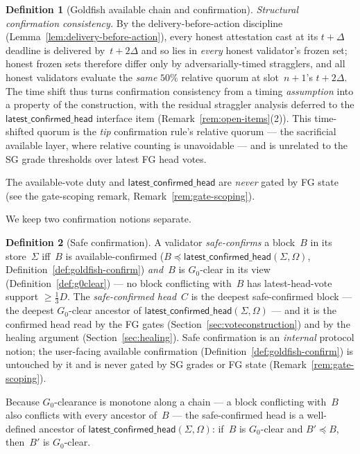 \ifx\litemode\undefined\documentclass{article}\fi
\newcommand{\Dvote}{\ensuremath{D}}         %
\newcommand{\Gzero}{\ensuremath{G_{0}}}
\newcommand{\latestConfirmed}{\textsf{latest\_confirmed\_head}\xspace}
\theoremstyle{plain}
\theoremstyle{definition}
\newtheorem{definition}{Definition}
\theoremstyle{remark}
\begin{document}
\begin{definition}[Goldfish available chain and confirmation]
\emph{Structural confirmation consistency.}  By the delivery-before-action
discipline (Lemma~\ref{lem:delivery-before-action}), every honest attestation
cast at its $t+\Delta$ deadline is delivered by~$t+2\Delta$ and so lies in
\emph{every} honest validator's frozen set; honest frozen sets therefore differ
only by adversarially-timed stragglers, and all honest validators evaluate the
\emph{same} $50\%$ relative quorum at slot~$n+1$'s $t+2\Delta$.  The time shift
thus turns confirmation consistency from a timing \emph{assumption} into a
property of the construction, with the residual straggler analysis deferred to
the $\latestConfirmed$ interface item (Remark~\ref{rem:open-items}(2)).
This time-shifted quorum is the \emph{tip} confirmation rule's relative quorum
--- the sacrificial available layer, where relative counting is unavoidable ---
and is unrelated to the SG grade thresholds over latest FG head votes.

The available-vote duty and $\latestConfirmed$ are \emph{never} gated by FG
state (see the gate-scoping remark, Remark~\ref{rem:gate-scoping}).
\end{definition}

We keep two confirmation notions separate.

\begin{definition}[Safe confirmation]\label{def:safe-confirm}
A validator \emph{safe-confirms} a block~$B$ in its store~$\Sigma$ iff~$B$ is
available-confirmed ($B \preceq \latestConfirmed(\Sigma, \Omega)$,
Definition~\ref{def:goldfish-confirm}) \emph{and}~$B$ is $\Gzero$-clear in its
view (Definition~\ref{def:g0clear}) --- no block conflicting with~$B$ has
latest-head-vote support $\geq \tfrac13\Dvote$.  The \emph{safe-confirmed head}~$C$ is the
deepest safe-confirmed block --- the deepest $\Gzero$-clear ancestor of
$\latestConfirmed(\Sigma, \Omega)$ --- and it is the confirmed head read by the
FG gates (Section~\ref{sec:voteconstruction}) and by the healing argument
(Section~\ref{sec:healing}).  Safe confirmation is an \emph{internal} protocol
notion; the user-facing available confirmation
(Definition~\ref{def:goldfish-confirm}) is untouched by it and is never gated
by SG grades or FG state (Remark~\ref{rem:gate-scoping}).
\end{definition}

Because $\Gzero$-clearance is monotone along a chain --- a block conflicting
with~$B$ also conflicts with every ancestor of~$B$ --- the safe-confirmed head
is a well-defined ancestor of $\latestConfirmed(\Sigma, \Omega)$: if~$B$ is
$\Gzero$-clear and $B' \preceq B$, then~$B'$ is $\Gzero$-clear.
\end{document}
